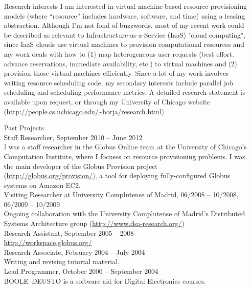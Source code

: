 \documentclass{resume}
\begin{document}
\begin{category}{Research interests}
\citembullet I am interested in virtual machine-based resource provisioning models (where ``resource'' includes hardware, software, and time) using a leasing abstraction. Although I'm not fond of buzzwords, most of my recent work could be described as relevant to Infrastructure-as-a-Service (IaaS) "cloud computing", since IaaS clouds use virtual machines to provision computational resources and my work deals with how to (1) map heterogeneous user requests (best effort, advance reservations, immediate availability, etc.) to virtual machines and (2) provision those virtual machines efficiently. Since a lot of my work involves writing resource scheduling code, my secondary interests include parallel job scheduling and scheduling performance metrics.  A detailed research statement is available upon request, or through my University of Chicago website (\url{http://people.cs.uchicago.edu/~borja/research.html})
\end{category}
\begin{category}{Past Projects}
\\
Staff Researcher, September 2010 -- June 2012\\
I was a staff researcher in the Globus Online team at the University of Chicago's Computation Institute, where I focuses on resource provisioning problems. I was the main developer of the Globus Provision project (\url{http://globus.org/provision/}), a tool for deploying fully-configured Globus systems on Amazon EC2.
\\
Visiting Researcher at University Complutense of Madrid, 06/2008 -- 10/2008, 06/2009 -- 10/2009\\
Ongoing collaboration with the University Complutense of Madrid's Distributed Systems Architecture group (\url{http://www.dsa-research.org/})
\\
Research Assistant, September 2005 -- 2008\\
\url{http://workspace.globus.org/}
\\
Research Associate, February 2004 -- July 2004\\
Writing and revising tutorial material.
\\ 
Lead Programmer, October 2000 -- September 2004\\
\textsf{BOOLE--DEUSTO} is a software aid for Digital Electronics courses.
\end{category}
\end{document}
